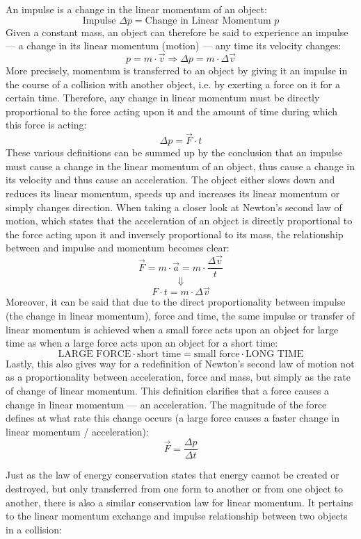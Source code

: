 An impulse is a change in the linear momentum of an object: $$\text{Impulse } \Delta p = \text{Change in Linear Momentum } p$$ Given a constant mass, an object can therefore be said to experience an impulse --- a change in its linear momentum (motion) --- any time its velocity changes: $$p = m \cdot \vec{v} \Rightarrow \Delta p = m \cdot \Delta \vec{v}$$ More precisely, momentum is transferred to an object by giving it an impulse in the course of a collision with another object, i.e. by exerting a force on it for a certain time. Therefore, any change in linear momentum must be directly proportional to the force acting upon it and the amount of time during which this force is acting: $$\Delta p = \vec{F} \cdot t$$ These various definitions can be summed up by the conclusion that an impulse must cause a change in the linear momentum of an object, thus cause a change in its velocity and thus cause an acceleration. The object either slows down and reduces its linear momentum, speeds up and increases its linear momentum or simply changes direction. When taking a closer look at Newton's second law of motion, which states that the acceleration of an object is directly proportional to the force acting upon it and inversely proportional to its mass, the relationship between and impulse and momentum becomes clear: $$\vec{F} = m \cdot \vec{a} = m \cdot \frac{\Delta \vec{v}}{t}$$ $$\Downarrow$$ $$F \cdot t = m \cdot \Delta \vec{v}$$ Moreover, it can be said that due to the direct proportionality between impulse (the change in linear momentum), force and time, the same impulse or transfer of linear momentum is achieved when a small force acts upon an object for large time as when a large force acts upon an object for a short time: $$\text{LARGE FORCE} \cdot \text{short time} = \text{small force} \cdot \text{LONG TIME}$$ Lastly, this also gives way for a redefinition of Newton's second law of motion not as a proportionality between acceleration, force and mass, but simply as the rate of change of linear momentum. This definition clarifies that a force causes a change in linear momentum --- an acceleration. The magnitude of the force defines at what rate this change occurs (a large force causes a faster change in linear momentum / acceleration): $$\vec{F} = \frac{\Delta p}{\Delta t}$$


Just as the law of energy conservation states that energy cannot be created or destroyed, but only transferred from one form to another or from one object to another, there is also a similar conservation law for linear momentum. It pertains to the linear momentum exchange and impulse relationship between two objects in a collision:

